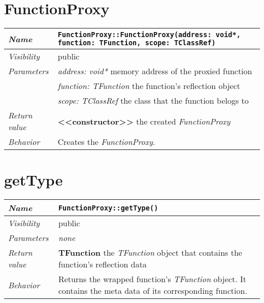 \section{FunctionProxy}
\begin{longtable}{p{3cm} @{\hskip 1cm} p{12cm}}
	\hline

	\textit{Name} & \texttt{FunctionProxy::FunctionProxy(address: void*, function: TFunction, scope: TClassRef)}\\
	\hline

	\textit{Visibility} & public\\
	\hline

	\textit{Parameters} & \textit{address: void*} memory address of the proxied function\\
		& \textit{function: TFunction} the function's reflection object\\
		& \textit{scope: TClassRef} the class that the function belogs to\\
	\hline

	\textit{Return value} & \textbf{<<constructor>>} the created \textit{FunctionProxy}\\
	\hline

	\textit{Behavior} & Creates the \textit{FunctionProxy}.\\
	\hline

\end{longtable}


\section{getType}
\begin{longtable}{p{3cm} @{\hskip 1cm} p{12cm}}
	\hline

	\textit{Name} & \texttt{FunctionProxy::getType()}\\
	\hline

	\textit{Visibility} & public\\
	\hline

	\textit{Parameters} & \textit{none}\\
	\hline

	\textit{Return value} & \textbf{TFunction} the \textit{TFunction} object that contains the function's reflection data\\
	\hline

	\textit{Behavior} & Returns the wrapped function's \textit{TFunction} object. It contains the meta data of its corresponding function.\\
	\hline

\end{longtable}


